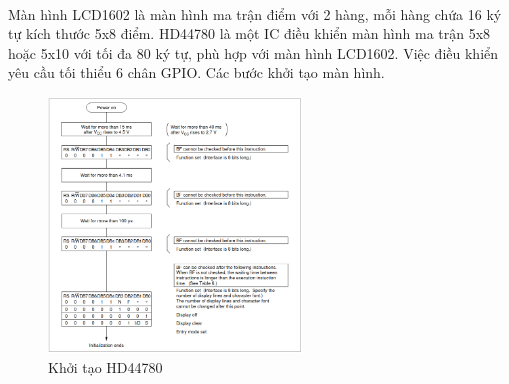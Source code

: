 \paragraph{}
Màn hình LCD1602 là màn hình ma trận điểm với 2 hàng, mỗi hàng chứa 16 ký tự kích thước 5x8 điểm. HD44780 là một IC điều khiển màn hình ma trận 5x8 hoặc 5x10 với tối đa 80 ký tự, phù hợp với màn hình LCD1602. Việc điều khiển yêu cầu tối thiểu 6 chân GPIO. Các bước khởi tạo màn hình.


\begin{figure}[H]
	\centering
	\includegraphics[width=0.6\textwidth]{images/hd44780_init.png}
	\caption{Khởi tạo HD44780}
\end{figure}